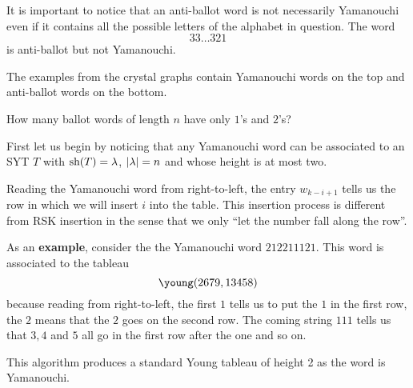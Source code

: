 \documentclass[12pt]{memoir}
\begin{document}
\begin{Rmk}
It is important to notice that an anti-ballot word is not necessarily Yamanouchi even if it contains all the possible letters of the alphabet in question. The word 
$$33\dots 321$$
is anti-ballot but not Yamanouchi.\par 
The examples from the crystal graphs contain Yamanouchi words on the top and anti-ballot words on the bottom.
\end{Rmk}

\begin{Ej}[Exercise 7]
    How many ballot words of length $n$ have only $1$'s and $2$'s?
\end{Ej}

\begin{ptcbr}
First let us begin by noticing that any Yamanouchi word can be associated to an SYT $T$ with $\text{sh}(T)=\lambda$, $|\lambda|=n$ and whose height is at most two.\par 
Reading the Yamanouchi word from right-to-left, the entry $w_{k-i+1}$ tells us the row in which we will insert $i$ into the table. This insertion process is different from RSK insertion in the sense that we only ``let the number fall along the row''.\par 
As an \textbf{example}, consider the the Yamanouchi word $212211121$. This word is associated to the tableau 
$$\young(2679,13458)$$
because reading from right-to-left, the first $1$ tells us to put the $1$ in the first row, the $2$ means that the $2$ goes on the second row. The coming string $111$ tells us that $3,4$ and $5$ all go in the first row after the one and so on.\par 
This algorithm produces a standard Young tableau of height 2 as the word is Yamanouchi. 
    \iffalse
    Let us begin by counting the small cases:
    \begin{itemize}
        \itemsep=-0.4em
        \item When $n=1$ we only have the word $1$. 
        \item When $n=2$ we have both $11$ and $21$. 
        \item When $n=3$ we have $111,211$ and $121$. We can't add $221$ because it stops being Yamanouchi.
        \item For $n=4$ the words are $1111,2111,1211,2211,1121$ and $2121$. 
        \item The next case is $n=5$ with 
        $$11111,21111,12111,22111,11211,21211,12211,11121,21121\word{and}12121.$$
        \item Notice now that we will get $20$ possibilities for $n=6$ because Yamanouchi words on $n=5$ all have three $1$'s and two $2$'s so it's possible to add a $1$ or a $2$ on each possibility which brings our total to $20$.
     \end{itemize}
We may count $n=7$ and $n=8$ to obtain $35$ and $70$.\par
Let us now call $a_n$, the number of Yamanouchi words of length $n$ with alphabet $\set{1,2}$. By using the duplication argument we have that 
$$a_{2n}=2a_{2n-1}$$
and now let us consider only the odd terms in $a_n$. We have  
$$1,3,10,35,126,\dots$$
\fi
\end{ptcbr}
\end{document}
